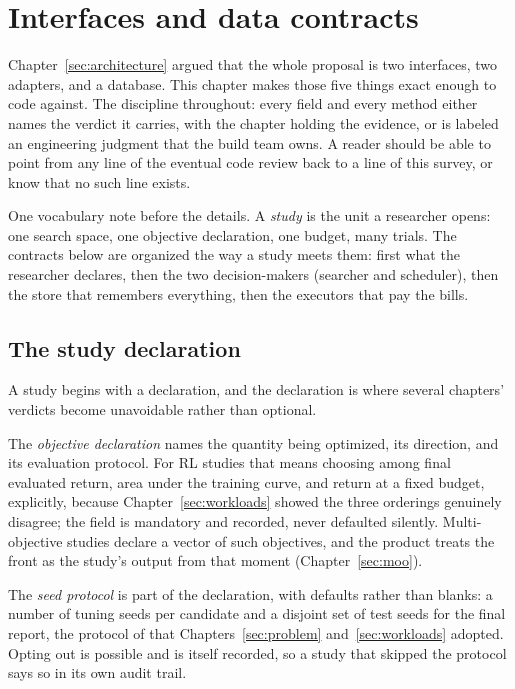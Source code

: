 \chapter{Interfaces and data contracts}
\label{sec:contracts}

Chapter~\ref{sec:architecture} argued that the whole proposal is two
interfaces, two adapters, and a database. This chapter makes those
five things exact enough to code against. The discipline throughout:
every field and every method either names the verdict it carries,
with the chapter holding the evidence, or is labeled an engineering
judgment that the build team owns. A reader should be able to point
from any line of the eventual code review back to a line of this
survey, or know that no such line exists.

One vocabulary note before the details. A \emph{study} is the unit a
researcher opens: one search space, one objective declaration, one
budget, many trials. The contracts below are organized the way a
study meets them: first what the researcher declares, then the two
decision-makers (searcher and scheduler), then the store that
remembers everything, then the executors that pay the bills.

\section{The study declaration}

A study begins with a declaration, and the declaration is where
several chapters' verdicts become unavoidable rather than optional.

The \emph{objective declaration} names the quantity being optimized,
its direction, and its evaluation protocol. For RL studies that means
choosing among final evaluated return, area under the training curve,
and return at a fixed budget, explicitly, because
Chapter~\ref{sec:workloads} showed the three orderings genuinely
disagree; the field is mandatory and recorded, never defaulted
silently. Multi-objective studies declare a vector of such
objectives, and the product treats the front as the study's output
from that moment (Chapter~\ref{sec:moo}).

The \emph{seed protocol} is part of the declaration, with defaults
rather than blanks: a number of tuning seeds per candidate and a
disjoint set of test seeds for the final report, the protocol of
\citet{eimer2023hyperparameters} that Chapters~\ref{sec:problem}
and~\ref{sec:workloads} adopted. Opting out is possible and is
itself recorded, so a study that skipped the protocol says so in its
own audit trail.

